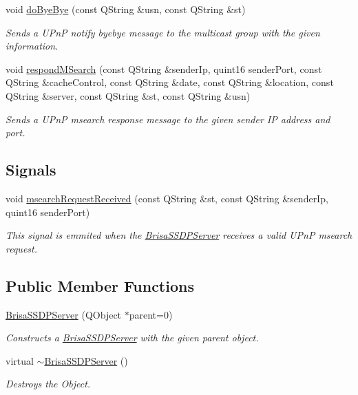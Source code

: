 \begin{DoxyCompactItemize}
void \hyperlink{classBrisaUpnp_1_1BrisaSSDPServer_afe21b672caca021dbed29b7e0e7a9744}{doByeBye} (const QString \&usn, const QString \&st)
\begin{DoxyCompactList}\small\item\em Sends a UPnP notify byebye message to the multicast group with the given information. \item\end{DoxyCompactList}\item 
void \hyperlink{classBrisaUpnp_1_1BrisaSSDPServer_abd6220bed881e7e33c6e49a84388996a}{respondMSearch} (const QString \&senderIp, quint16 senderPort, const QString \&cacheControl, const QString \&date, const QString \&location, const QString \&server, const QString \&st, const QString \&usn)
\begin{DoxyCompactList}\small\item\em Sends a UPnP msearch response message to the given sender IP address and port. \item\end{DoxyCompactList}\end{DoxyCompactItemize}
\subsection*{Signals}
\begin{DoxyCompactItemize}
\item 
void \hyperlink{classBrisaUpnp_1_1BrisaSSDPServer_a81aff8b072c5fe63f1b3011c5084866a}{msearchRequestReceived} (const QString \&st, const QString \&senderIp, quint16 senderPort)
\begin{DoxyCompactList}\small\item\em This signal is emmited when the \hyperlink{classBrisaUpnp_1_1BrisaSSDPServer}{BrisaSSDPServer} receives a valid UPnP msearch request. \item\end{DoxyCompactList}\end{DoxyCompactItemize}
\subsection*{Public Member Functions}
\begin{DoxyCompactItemize}
\item 
\hyperlink{classBrisaUpnp_1_1BrisaSSDPServer_aab381a208bb65f63e4e10f6c4e5429b9}{BrisaSSDPServer} (QObject $\ast$parent=0)
\begin{DoxyCompactList}\small\item\em Constructs a \hyperlink{classBrisaUpnp_1_1BrisaSSDPServer}{BrisaSSDPServer} with the given parent object. \item\end{DoxyCompactList}\item 
virtual \hyperlink{classBrisaUpnp_1_1BrisaSSDPServer_adc16bda24aefcfddada56fedd69483f6}{$\sim$BrisaSSDPServer} ()
\begin{DoxyCompactList}\small\item\em Destroys the Object. \item\end{DoxyCompactList}\end{DoxyCompactItemize}


